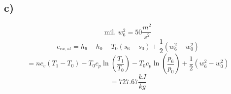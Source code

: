 

\subsection*{c)}
\[
\text{mil. } w_6^2 = 50 \frac{m^2}{s^2}
\]
\[
e_{ex,st} = h_6 - h_0 - T_0 \left( s_6 - s_0 \right) + \frac{1}{2} \left( w_6^2 - w_0^2 \right)
\]
\[
= n c_v \left( T_1 - T_0 \right) - T_0 c_p \ln \left( \frac{T_1}{T_0} \right) - T_0 c_p \ln \left( \frac{p_6}{p_0} \right) + \frac{1}{2} \left( w_6^2 - w_0^2 \right)
\]
\[
= 727.67 \frac{kJ}{kg}
\]
